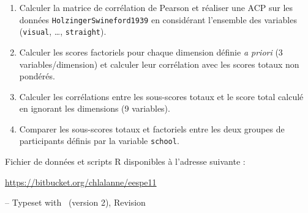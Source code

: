 
\begin{enumerate}
\item Calculer la matrice de corrélation de Pearson et réaliser une ACP sur les
  données \texttt{HolzingerSwineford1939} en considérant l'ensemble des
  variables (\texttt{visual}, \ldots, \texttt{straight}).
\item Calculer les scores factoriels pour chaque dimension définie \emph{a
    priori} (3 variables/dimension) et calculer leur corrélation avec les scores
  totaux non pondérés.
\item Calculer les corrélations entre les sous-scores totaux et le score total
  calculé en ignorant les dimensions (9 variables).
\item Comparer les sous-scores totaux et factoriels entre les deux groupes de
  participants définis par la variable \texttt{school}.
\end{enumerate}


\foilhead{}

Fichier de données et scripts R disponibles à l'adresse suivante :\newline
{\centering \url{https://bitbucket.org/chlalanne/eespe11}\par}
\vfill

\raggedleft \scriptsize -- Typeset with \FoilTeX\ (version 2), Revision \VCRevision


